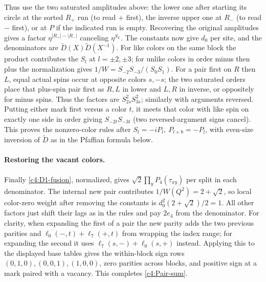 Thus use the two saturated amplitudes above: the lower one after starting its circle at the sorted \(R_+\) run (to read \(+\) first), the inverse upper one at \(R_-\) (to read \(-\) first), or at \(P\) if the indicated run is empty. Recovering the original amplitudes gives a factor \(\eta^{|R_+|-|R_-|}\) canceling \(\eta^{S_L}\). The constants now give \(d_0\) per site, and the denominators are \(\widetilde D(X)\widetilde D(X^{-1})\). For like colors on the same block the product contributes the \(S_l\) at \(l=\pm2,\pm3\); for unlike colors in order minus then plus the normalization gives \(1/W=S_{-2}S_{-3}/(S_0 S_1)\). For a pair first on \(R\) then \(L\), equal actual spins occur at opposite colors \(s,-s\); the two saturated orders place that plus-spin pair first as \(R,L\) in lower and \(L,R\) in inverse, or oppositely for minus spins. Thus the factors are \(S_{2s}^2 S_{3s}^2\); similarly with arguments reversed. Putting either mark first versus a color \(t\), it meets that color with like spin on exactly one side in order giving \(S_{-2t} S_{-3t}\) (two reversed-argument signs cancel). This proves the nonzero-color rules after \(S_l=-iP_l,\ P_{l+8}=-P_l\), with even-size inversion of \(\widetilde D\) as in the Pfaffian formula below.

\paragraph{Restoring the vacant colors.} Finally \eqref{c4:D1-fusion}, normalized, gives \(\sqrt2\prod_y P_4(\tau_{xy})\) per split in each denominator. The internal new pair contributes \(1/W(Q^2)=2+\sqrt2\), so local color-zero weight after removing the constants is \(d_0^2(2+\sqrt2)/2=1\). All other factors just shift their lags as in the rules and pay \(2e_4\) from the denominator. For clarity, when expanding the first of a pair the new parity adds the two previous parities and \(\ell_0(-,t)+\ell_7(+,t)\) from wrapping the index range; for expanding the second it uses \(\ell_7(s,-)+\ell_0(s,+)\) instead. Applying this to the displayed base tables gives the within-block sign rows \((0,1,0),(0,0,1),(1,0,0)\), zero parities across blocks, and positive sign at a mark paired with a vacancy. This completes \eqref{c4:Pair-sum}.
